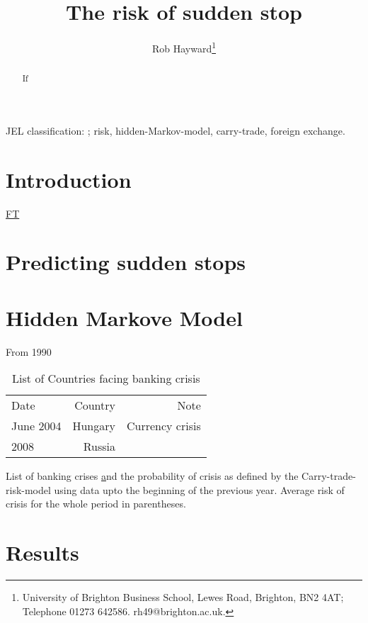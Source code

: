 \documentclass[preprint,12pt,authoryear]{elsarticle}
\begin{document}
\begin{frontmatter}
\title{The risk of sudden stop}
\author{Rob Hayward\footnote{University of Brighton Business School, Lewes Road, Brighton, BN2 4AT; Telephone 01273 642586.  rh49@brighton.ac.uk.}}

\begin{abstract}
If       
\end{abstract}
\begin{keyword}
JEL classification: ; risk, hidden-Markov-model, carry-trade, foreign exchange.
\end{keyword}

\end{frontmatter}
\section*{Introduction}
\href{https://next.ft.com/content/d73e27de-78d4-11e5-a95a-27d368e1ddf7}{FT}
\section*{Predicting sudden stops}
\section*{Hidden Markove Model}

From 1990
\begin{table}
\begin{threeparttable}
\centering
\begin{tabular}{l r r}
\hline
Date & Country & Note\\
June 2004 & Hungary & Currency crisis\\
2008 & Russia & \\
\hline
\end{tabular}
\begin{tablenotes}
\small
\item List of banking crises \href{ReinhartRogoff} and the probability of crisis as defined by the Carry-trade-risk-model using data upto the beginning of the previous year.  Average risk of crisis for the whole period in parentheses.  
\caption{List of Countries facing banking crisis}
\end{tablenotes}
\end{threeparttable}
\label{}
\end{table}




\section{Results}
\end{document}

